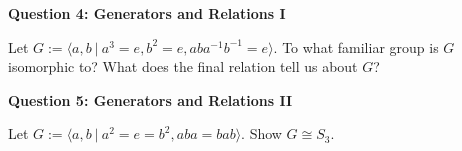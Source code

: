 \documentclass[11pt,twoside, a4paper]{report}
\theoremstyle{plain}
\theoremstyle{definition}
\begin{document}
  
\begin{center}
{\bf Question 4: Generators and Relations I}
\end{center}

Let $G:=\langle a,b \ | \ a^{3}=e, b^{2}=e, aba^{-1}b^{-1}=e \rangle$. To what familiar group is $G$ isomorphic to? What does the final relation tell us about $G$? 

  
\begin{center}
{\bf Question 5: Generators and Relations II}
\end{center}

Let $G:=\langle a,b \ | \ a^{2}=e=b^{2}, aba=bab \rangle$. Show $G \cong S_{3}$. 
\end{document}
